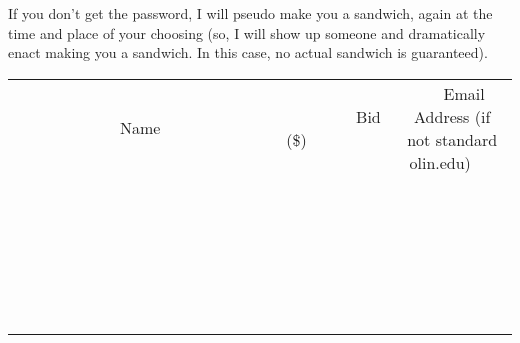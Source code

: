 \documentclass[11pt]{article}
\begin{document}
If you don't get the password, I will pseudo make you a sandwich, again at the time and place of your choosing (so, I will show up someone and dramatically enact making you a sandwich. In this case, no actual sandwich is guaranteed).
\\[6ex]
\begin{tabular}{c c c}
~~~~~~~~~~~~~Name~~~~~~~~~~~~~ & ~~~~~~~~~Bid (\$)~~~~~~~~~  & ~~~Email Address (if not standard olin.edu)~~~\\
 & & \\
\hline
 & & \\
\hline
 & & \\
\hline
 & & \\
\hline
 & & \\
\hline
 & & \\
\hline
 & & \\
\hline
 & & \\
\hline
 & & \\
\hline
 & & \\
\hline
 & & \\
\hline
 & & \\
\hline
 & & \\
\hline
 & & \\
\hline
 & & \\
\hline
 & & \\
\hline
 & & \\
\hline
 & & \\
\hline
 & & \\
\hline
 & & \\
\hline
 & & \\
\hline
 & & \\
\hline
 & & \\
\hline
 & & \\
\hline
 & & \\
\hline
 & & \\
\hline
\end{tabular}
\newpage
\end{document}
